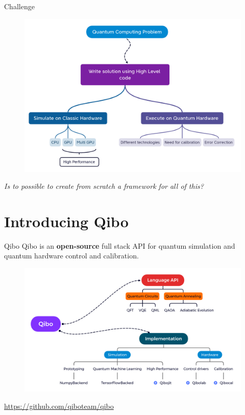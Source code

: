 \documentclass[11p,aspectratio=169]{beamer}
\begin{document}
\begin{frame}{Challenge}
    \begin{figure}
        \includegraphics[width=\textwidth]{figures/intro.png}
    \end{figure}
    \vspace{-0.5cm}

    \centering
    \emph{Is to possible to create from scratch a framework for all of this?}
\end{frame}


    
    



\section{Introducing Qibo}

\begin{frame}{Qibo}
    Qibo is an \textbf{open-source} full stack API for quantum simulation and quantum hardware control and calibration.
    \begin{figure}
        \includegraphics[width= \textwidth]{figures/Qibo.png}
    \end{figure}
    \vspace{-1cm}
\begin{center}
    \url{https://github.com/qiboteam/qibo}
\end{center}
\end{frame}
\end{document}

